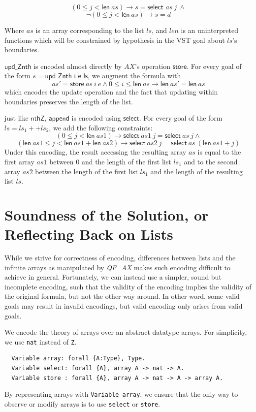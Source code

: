 \documentclass[onecolumn, preprint]{sigplanconf}
\begin{document}
$$ (0 \leq j < \textsf{len}\ as) \to s = \textsf{select } as\ j\ \wedge$$
$$\neg (0 \leq j < \textsf{len}\ as) \to s = d $$

Where $as$ is an array corresponding to the list $ls$, and $len$ is an uninterpreted functions which will be constrained by hypothesis in the VST goal about $ls$'s boundaries.


$\textsf{upd\_Znth}$ is encoded almost directly by $AX$'s operation $\textsf{store}$. For every goal of the form $s = \textsf{upd\_Znth\ i\ e\ ls}$, we augment the formula with
$$ as' = \textsf{store}\ as\ i\ e \wedge 0 \leq i \leq \textsf{len}\ as \to \textsf{len}\ as' = \textsf{len}\ as$$
which encodes the update operation and the fact that updating within boundaries preserves the length of the list.


just like $\textsf{nthZ}$, $\textsf{append}$ is encoded using $\textsf{select}$. For every goal of the form $ls = ls_1 ++ ls_2$, we add the following constraints:
$$(0 \leq j < \textsf{len}\ as1) \to \textsf{select}\ as1\ j = \textsf{select}\ as\ j \wedge $$
$$(\textsf{len}\ as1 \leq j < \textsf{len}\ as1 + \textsf{len}\ as2) \to \textsf{select}\ as2\ j = \textsf{select}\ as\ (\textsf{len}\ as1 + j)$$
Under this encoding, the result accessing the resulting array $as$ is equal to the first array $as1$ between $0$ and the length of the first list $ls_1$ and to the second array $as2$ between the length of the first list $ls_1$ and the length of the resulting list $ls$.




\section{Soundness of the Solution, or Reflecting Back on Lists}
\label{sec:proofs}
While we strive for correctness of encoding, differences between lists
and the infinite arrays as manipulated by \emph{QF\_AX} makes such encoding difficult to achieve in general. 
Fortunately, we can instead use a simpler, sound but incomplete encoding, such that the validity 
of the encoding implies the validity of the original formula, but not the other way around.
In other word, some valid goals may result in invalid encodings, but valid encoding only arises from valid goals.


We encode the theory of arrays over an abstract datatype arrays. For simplicity, we use \lstinline|nat| instead of \lstinline|Z|.  
\begin{lstlisting}
  Variable array: forall {A:Type}, Type.
  Variable select: forall {A}, array A -> nat -> A.
  Variable store : forall {A}, array A -> nat -> A -> array A.
\end{lstlisting}
By representing arrays with \lstinline|Variable array|, we ensure that the only way to observe or modify arrays is to use \lstinline|select| or \lstinline|store|.
\end{document}
